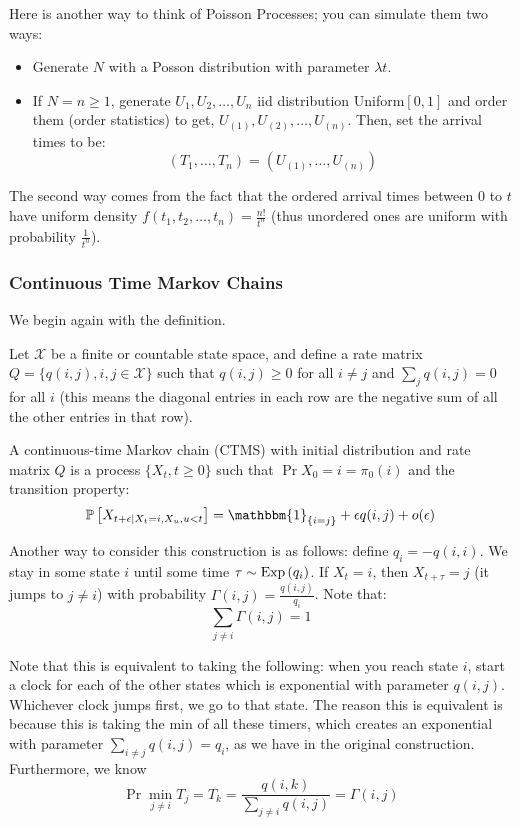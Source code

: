 Here is another way to think of Poisson Processes; you can simulate them two ways:
\begin{itemize}
    \item Generate $N$ with a Posson distribution with parameter $\lambda t$.
    \item If $N = n \geq 1$, generate $U_1, U_2, \dots, U_n$ iid distribution Uniform$[0, 1]$ and
    order them (order statistics) to get, $U_{(1)}, U_{(2)}, \dots, U_{(n)}$. Then,
    set the arrival times to be:
    \[ (T_1, \dots, T_n) = (U_{(1)}, \dots, U_{(n)}) \]
\end{itemize}

The second way comes from the fact that the ordered arrival times between $0$ to $t$
have uniform density $f(t_1, t_2, \dots, t_n) = \frac{n!}{t^n}$ (thus unordered ones are uniform with probability $\frac{1}{t^n}$).

\subsubsection{Continuous Time Markov Chains}
We begin again with the definition.
\begin{definition}
    Let $\mathcal{X}$ be a finite or countable state space, and define a rate matrix $Q = \{q(i, j), i, j \in \mathcal{X}\}$
    such that $q(i, j) \geq 0$ for all $i \neq j$ and $\sum_{j} q(i, j) = 0$ for all $i$ (this means the
    diagonal entries in each row are the negative sum of all the other entries in that row).

    A continuous-time Markov chain (CTMS) with initial distribution and rate matrix $Q$ is a process
    $\{X_t, t \geq 0\}$ such that $\Pr{X_0 = i} = \pi_0(i)$ and the transition property:
    \[ \Pr{X_{t + \epsilon \mid X_t = i, X_u, u < t}} = \mathbbm{1}_{\{i = j\}} + \epsilon q(i, j) + o(\epsilon) \]

    Another way to consider this construction is as follows:
    define $q_i = -q(i, i)$. We stay in some state $i$ until some time $\tau \sim \text{Exp}\left( q_i \right)$. If $X_t = i$,
    then $X_{t + \tau} = j$ (it jumps to $j \neq i$) with probability $\Gamma(i, j) = \frac{q(i,j)}{q_i}$.
    Note that:
    \[ \sum_{j \neq i} \Gamma(i, j) = 1 \]
\end{definition}

Note that this is equivalent to taking the following: when you reach state $i$, start a clock for each of the other states
which is exponential with parameter $q(i, j)$. Whichever clock jumps first, we go to that state. The reason this is equivalent is because
this is taking the min of all these timers, which creates an exponential with parameter $\sum_{i \neq j} q(i, j) = q_i$, as we
have in the original construction. Furthermore, we know
\[ \Pr{\min_{j \neq i} T_j = T_k} = \frac{q(i, k)}{\sum_{j \neq i} q(i, j)} = \Gamma(i, j) \]
